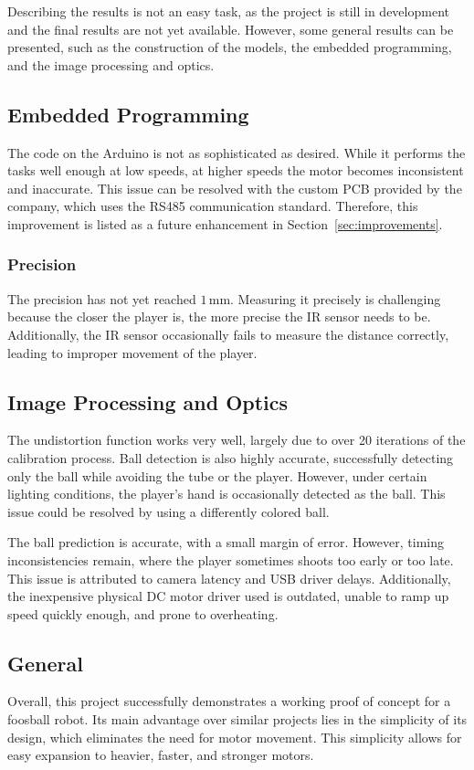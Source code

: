 Describing the results is not an easy task, as the project is still in development and the final results are not yet available.
However, some general results can be presented, such as the construction of the models, the embedded programming, and the image processing and optics.

\subsection{Embedded Programming}\label{subsec:results_embedded}
The code on the Arduino is not as sophisticated as desired.
While it performs the tasks well enough at low speeds, at higher speeds the motor becomes inconsistent and inaccurate.
This issue can be resolved with the custom PCB provided by the company, which uses the RS485 communication standard.
Therefore, this improvement is listed as a future enhancement in Section~\ref{sec:improvements}.

\subsubsection{Precision}\label{subsubsec:precision}
The precision has not yet reached $1\,\mathrm{mm}$.
Measuring it precisely is challenging because the closer the player is, the more precise the IR sensor needs to be.
Additionally, the IR sensor occasionally fails to measure the distance correctly, leading to improper movement of the player.

\subsection{Image Processing and Optics}\label{subsec:results_image}
The undistortion function works very well, largely due to over 20 iterations of the calibration process.
Ball detection is also highly accurate, successfully detecting only the ball while avoiding the tube or the player.
However, under certain lighting conditions, the player’s hand is occasionally detected as the ball.
This issue could be resolved by using a differently colored ball.

The ball prediction is accurate, with a small margin of error.
However, timing inconsistencies remain, where the player sometimes shoots too early or too late.
This issue is attributed to camera latency and USB driver delays.
Additionally, the inexpensive physical DC motor driver used is outdated, unable to ramp up speed quickly enough, and prone to overheating.

\subsection{General}\label{subsec:general}
Overall, this project successfully demonstrates a working proof of concept for a foosball robot.
Its main advantage over similar projects lies in the simplicity of its design, which eliminates the need for motor movement.
This simplicity allows for easy expansion to heavier, faster, and stronger motors.

